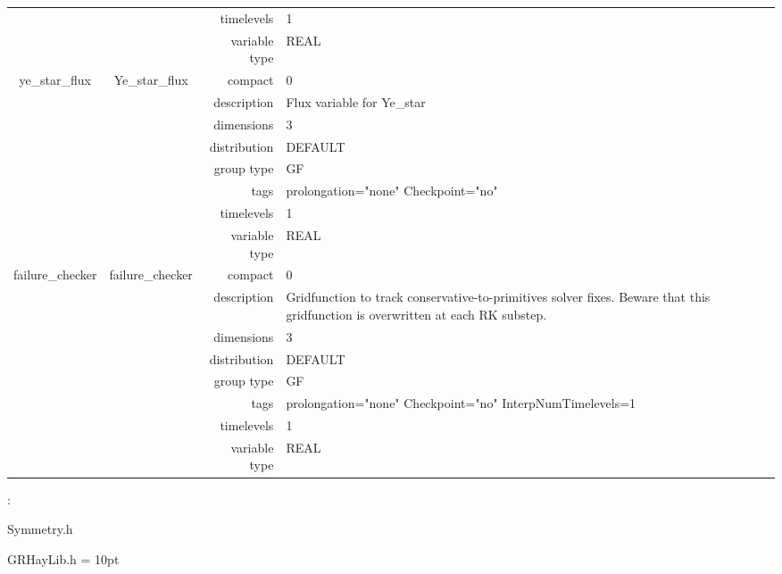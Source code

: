 \begin{tabular*}{150mm}{|c|c@{\extracolsep{\fill}}|rl|}
 &  & timelevels & 1 \\ 
 &  & variable type & REAL \\ 
\hline 
ye\_star\_flux & Ye\_star\_flux & compact & 0 \\ 
 &  & description & Flux variable for Ye\_star \\ 
 &  & dimensions & 3 \\ 
 &  & distribution & DEFAULT \\ 
 &  & group type & GF \\ 
 &  & tags & prolongation="none" Checkpoint="no" \\ 
 &  & timelevels & 1 \\ 
 &  & variable type & REAL \\ 
\hline 
failure\_checker & failure\_checker & compact & 0 \\ 
 &  & description & Gridfunction to track conservative-to-primitives solver fixes. Beware that this gridfunction is overwritten at each RK substep. \\ 
 &  & dimensions & 3 \\ 
 &  & distribution & DEFAULT \\ 
 &  & group type & GF \\ 
 &  & tags & prolongation="none" Checkpoint="no" InterpNumTimelevels=1 \\ 
 &  & timelevels & 1 \\ 
 &  & variable type & REAL \\ 
\hline 
\end{tabular*} 



\vspace{5mm}

: 

Symmetry.h

GRHayLib.h
\vspace{2mm}\parskip = 10pt 

